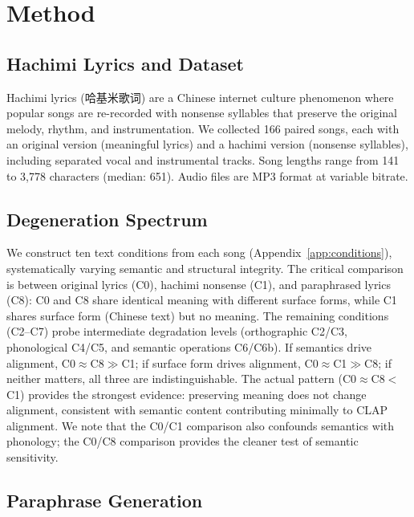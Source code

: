 \documentclass[11pt]{article}
\begin{document}
\section{Method}\label{sec:method}

\subsection{Hachimi Lyrics and Dataset}

Hachimi lyrics (\textrm{哈基米歌词}) are a Chinese internet culture phenomenon where popular songs are re-recorded with nonsense syllables that preserve the original melody, rhythm, and instrumentation. We collected 166 paired songs, each with an original version (meaningful lyrics) and a hachimi version (nonsense syllables), including separated vocal and instrumental tracks. Song lengths range from 141 to 3,778 characters (median: 651). Audio files are MP3 format at variable bitrate.

\subsection{Degeneration Spectrum}

We construct ten text conditions from each song (Appendix~\ref{app:conditions}), systematically varying semantic and structural integrity. The critical comparison is between original lyrics (C0), hachimi nonsense (C1), and paraphrased lyrics (C8): C0 and C8 share identical meaning with different surface forms, while C1 shares surface form (Chinese text) but no meaning. The remaining conditions (C2--C7) probe intermediate degradation levels (orthographic C2/C3, phonological C4/C5, and semantic operations C6/C6b). If semantics drive alignment, C0$\approx$C8$\gg$C1; if surface form drives alignment, C0$\approx$C1$\gg$C8; if neither matters, all three are indistinguishable. The actual pattern (C0$\approx$C8${<}$C1) provides the strongest evidence: preserving meaning does not change alignment, consistent with semantic content contributing minimally to CLAP alignment. We note that the C0/C1 comparison also confounds semantics with phonology; the C0/C8 comparison provides the cleaner test of semantic sensitivity.

\subsection{Paraphrase Generation}\label{sec:paraphrase}
\end{document}

